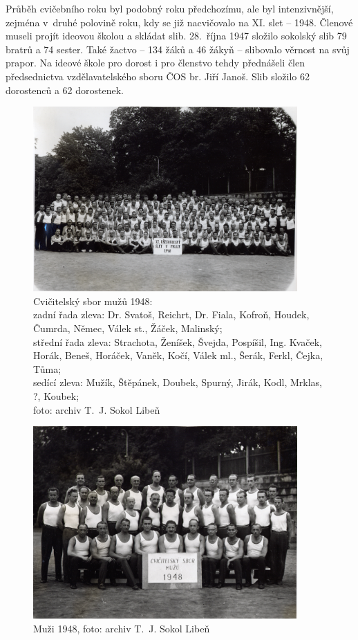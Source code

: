 \documentclass[a5paper, 11pt, twoside]{article}
\begin{document}
Průběh cvičebního roku byl podobný roku předchozímu, ale byl
intenzivnější, zejména v~druhé polovině roku, kdy se již nacvičovalo na
XI. slet -- 1948. Členové museli projít ideovou školou a skládat slib.
28.~října 1947 složilo sokolský slib 79 bratrů a 74 sester. Také žactvo
-- 134 žáků a 46 žákyň -- slibovalo věrnost na svůj prapor. Na ideové
škole pro dorost i pro členstvo tehdy přednášeli člen předsednictva
vzdělavatelského sboru ČOS br. Jiří Janoš. Slib složilo 62 dorostenců a
62 dorostenek.

\begin{figure}[h!]
  \centering 
  \includegraphics[width=0.9\textwidth]{img/31_muzi_cvicitele.jpg}
  \caption*{Cvičitelský sbor mužů 1948:\\zadní řada zleva: Dr. Svatoš, Reichrt,
  Dr. Fiala, Kofroň, Houdek, Čumrda, Němec, Válek st., Žáček, Malinský;\\
  střední řada zleva: Strachota, Ženíšek, Švejda, Pospíšil, Ing. Kvaček,
  Horák, Beneš, Horáček, Vaněk, Kočí, Válek ml., Šerák, Ferkl, Čejka,
  Tůma;\\sedící zleva: Mužík, Štěpánek, Doubek, Spurný, Jirák, Kodl,
  Mrklas, ?, Koubek;\\foto: archiv T.~J. Sokol Libeň}
\end{figure}

\begin{figure}[h!]
  \centering 
  \includegraphics[width=0.9\textwidth]{img/32_muzi_cvicitele.jpg}
  \caption*{Muži 1948, foto: archiv T.~J. Sokol Libeň}
\end{figure}
\vspace{\fill}
\end{document}
